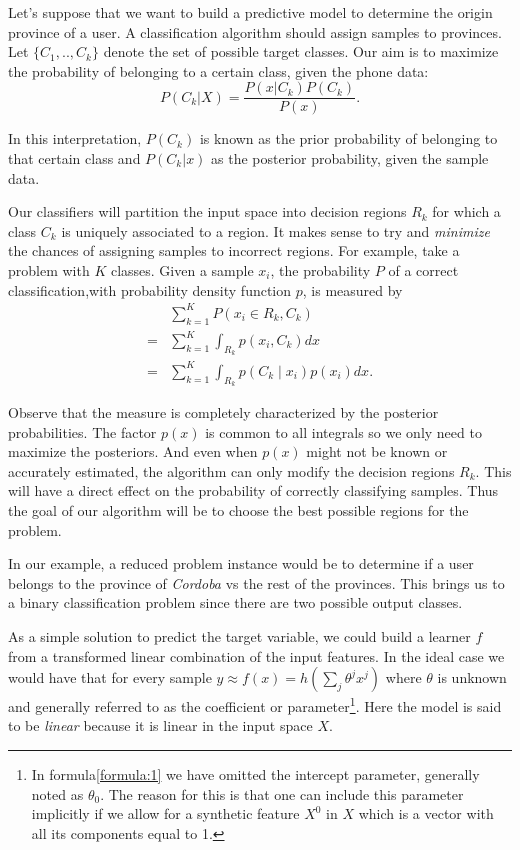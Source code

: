 Let's suppose that we want to build a predictive model to determine the origin province of a user. A classification algorithm should assign samples to provinces. Let $\{C_1,..,C_k\}$ denote the set of possible target classes. Our aim is to maximize the probability of belonging to a certain class, given the phone data:
\begin{equation}
P(C_k| X) = \frac{P(x|C_k)P(C_k)}{P(x)} .
\end{equation}

In this interpretation, $P(C_k)$ is known as the prior probability of belonging to that certain class and $P(C_k|x)$ as the posterior probability, given the sample data.

Our classifiers will partition the input space into decision regions $R_k$ for which a class $C_k$ is uniquely associated to a region. It makes sense to try and \textit{minimize} the chances of assigning samples to incorrect regions. For example, take a problem with $K$ classes. Given a sample $x_i$, the probability $P$ of a correct classification,with probability density function $p$, is measured by
\begin{equation}\label{eq:goodclassification-equation}
\begin{split}
  & \sum_{k=1}^{K} P(x_i \in R_k, C_k ) \\
= & \sum_{k=1}^{K} \int_{R_k}p(x_i,C_k) dx \\
= & \sum_{k=1}^{K} \int_{R_k}p(C_k \mid x_i) p(x_i) dx .
\end{split}
\end{equation}

Observe that the measure is completely characterized by the posterior probabilities. The factor $p(x)$ is common to all integrals so we only need to maximize the posteriors. And even when $p(x)$ might not be known or accurately estimated, the algorithm can only modify the decision regions $R_k$. This will have a direct effect on the probability of correctly classifying samples. Thus the goal of our algorithm will be to choose the best possible regions for the problem.

In our example, a reduced problem instance would be to determine if a user belongs to the province of \textit{Cordoba} vs the rest of the provinces. This brings us to a binary classification problem since there are two possible output classes. %

As a simple solution to predict the target variable, we could build a learner $f$ from a transformed linear combination of the input features. In the ideal case we would have that for every sample $y \approx f(x) = h\left(\sum_{j}\theta^j x^j\right)$\label{formula:1} where $\theta$ is unknown and generally referred to as the coefficient or parameter\footnote{In formula\cref{formula:1} we have omitted the intercept parameter, generally noted as $\theta_0$. The reason for this is that one can include this parameter implicitly if we allow for a synthetic feature $X^0$ in $X$ which is a vector with all its components equal to 1.}. Here the model is said to be \textit{linear} because it is linear in the input space $X$.

